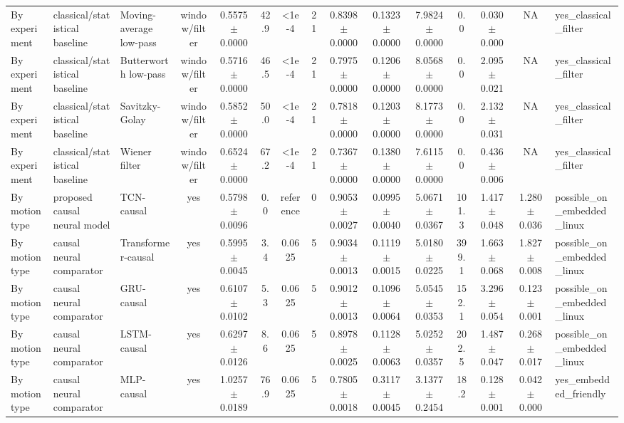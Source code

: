 \begin{table}[t]
{\begin{tabular}{lllcccccccccccl}
By experiment & classical/statistical baseline & Moving-average low-pass & window/filter & 0.5575 $\pm$ 0.0000 & 42.9 & <1e-4 & 21 & 0.8398 $\pm$ 0.0000 & 0.1323 $\pm$ 0.0000 & 7.9824 $\pm$ 0.0000 & 0.0 & 0.030 $\pm$ 0.000 & NA & yes\_classical\_filter \\
By experiment & classical/statistical baseline & Butterworth low-pass & window/filter & 0.5716 $\pm$ 0.0000 & 46.5 & <1e-4 & 21 & 0.7975 $\pm$ 0.0000 & 0.1206 $\pm$ 0.0000 & 8.0568 $\pm$ 0.0000 & 0.0 & 2.095 $\pm$ 0.021 & NA & yes\_classical\_filter \\
By experiment & classical/statistical baseline & Savitzky-Golay & window/filter & 0.5852 $\pm$ 0.0000 & 50.0 & <1e-4 & 21 & 0.7818 $\pm$ 0.0000 & 0.1203 $\pm$ 0.0000 & 8.1773 $\pm$ 0.0000 & 0.0 & 2.132 $\pm$ 0.031 & NA & yes\_classical\_filter \\
By experiment & classical/statistical baseline & Wiener filter & window/filter & 0.6524 $\pm$ 0.0000 & 67.2 & <1e-4 & 21 & 0.7367 $\pm$ 0.0000 & 0.1380 $\pm$ 0.0000 & 7.6115 $\pm$ 0.0000 & 0.0 & 0.436 $\pm$ 0.006 & NA & yes\_classical\_filter \\
\midrule
By motion type & proposed causal neural model & TCN-causal & yes & 0.5798 $\pm$ 0.0096 & 0.0 & reference & 0 & 0.9053 $\pm$ 0.0027 & 0.0995 $\pm$ 0.0040 & 5.0671 $\pm$ 0.0367 & 101.3 & 1.417 $\pm$ 0.048 & 1.280 $\pm$ 0.036 & possible\_on\_embedded\_linux \\
By motion type & causal neural comparator & Transformer-causal & yes & 0.5995 $\pm$ 0.0045 & 3.4 & 0.0625 & 5 & 0.9034 $\pm$ 0.0013 & 0.1119 $\pm$ 0.0015 & 5.0180 $\pm$ 0.0225 & 399.1 & 1.663 $\pm$ 0.068 & 1.827 $\pm$ 0.008 & possible\_on\_embedded\_linux \\
By motion type & causal neural comparator & GRU-causal & yes & 0.6107 $\pm$ 0.0102 & 5.3 & 0.0625 & 5 & 0.9012 $\pm$ 0.0013 & 0.1096 $\pm$ 0.0064 & 5.0545 $\pm$ 0.0353 & 152.1 & 3.296 $\pm$ 0.054 & 0.123 $\pm$ 0.001 & possible\_on\_embedded\_linux \\
By motion type & causal neural comparator & LSTM-causal & yes & 0.6297 $\pm$ 0.0126 & 8.6 & 0.0625 & 5 & 0.8978 $\pm$ 0.0025 & 0.1128 $\pm$ 0.0063 & 5.0252 $\pm$ 0.0357 & 202.5 & 1.487 $\pm$ 0.047 & 0.268 $\pm$ 0.017 & possible\_on\_embedded\_linux \\
By motion type & causal neural comparator & MLP-causal & yes & 1.0257 $\pm$ 0.0189 & 76.9 & 0.0625 & 5 & 0.7805 $\pm$ 0.0018 & 0.3117 $\pm$ 0.0045 & 3.1377 $\pm$ 0.2454 & 18.2 & 0.128 $\pm$ 0.001 & 0.042 $\pm$ 0.000 & yes\_embedded\_friendly \\

\end{tabular}}
\end{table}
